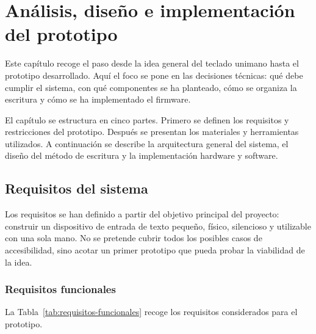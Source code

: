 \chapter{Análisis, diseño e implementación del prototipo}
\label{ch:analisis-diseno-implementacion}

Este capítulo recoge el paso desde la idea general del teclado unimano hasta el prototipo desarrollado. Aquí el foco se pone en las decisiones técnicas: qué debe cumplir el sistema, con qué componentes se ha planteado, cómo se organiza la escritura y cómo se ha implementado el firmware.

El capítulo se estructura en cinco partes. Primero se definen los requisitos y restricciones del prototipo. Después se presentan los materiales y herramientas utilizados. A continuación se describe la arquitectura general del sistema, el diseño del método de escritura y la implementación hardware y software.

\section{Requisitos del sistema}
\label{sec:requisitos-sistema}

Los requisitos se han definido a partir del objetivo principal del proyecto: construir un dispositivo de entrada de texto pequeño, físico, silencioso y utilizable con una sola mano. No se pretende cubrir todos los posibles casos de accesibilidad, sino acotar un primer prototipo que pueda probar la viabilidad de la idea.
\clearpage
\subsection{Requisitos funcionales}
\label{subsec:requisitos-funcionales-nuevo}

 La Tabla~\ref{tab:requisitos-funcionales} recoge los requisitos considerados para el prototipo.

